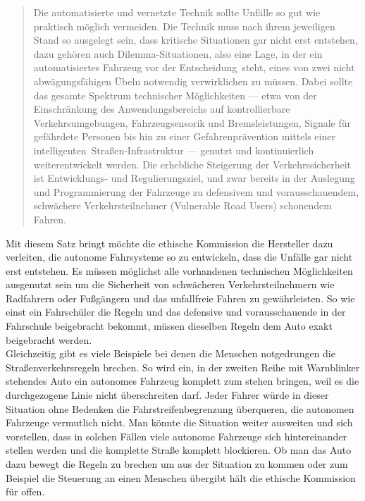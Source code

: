 \documentclass[twoside,a4paper,12pt]{article}
\begin{document}
\begin{quote}
\glqq
Die automatisierte und vernetzte Technik sollte Unfälle so gut wie praktisch möglich vermeiden. Die Technik muss nach 
ihrem jeweiligen Stand so ausgelegt sein, dass kritische
Situationen gar nicht erst entstehen, dazu gehören auch Dilemma-Situationen, also eine
Lage, in der ein automatisiertes Fahrzeug vor der \glqq Entscheidung\grqq\ steht, eines von zwei
nicht abwägungsfähigen Übeln notwendig verwirklichen zu müssen. Dabei sollte das gesamte Spektrum technischer 
Möglichkeiten --- etwa von der Einschränkung des Anwendungsbereichs auf kontrollierbare Verkehrsumgebungen, 
Fahrzeugsensorik und Bremsleistungen, Signale für gefährdete Personen bis hin zu einer Gefahrenprävention mittels
einer \glqq intelligenten\grqq\ Straßen-Infrastruktur --- genutzt und kontinuierlich weiterentwickelt
werden. Die erhebliche Steigerung der Verkehrssicherheit ist Entwicklungs- und Regulierungsziel, und zwar bereits in der 
Auslegung und Programmierung der Fahrzeuge zu defensivem und vorausschauendem, schwächere Verkehrsteilnehmer (\glqq Vulnerable Road
Users\grqq) schonendem Fahren.\grqq\mbox{~\cite[S. 10]{ek}}
\end{quote}
Mit diesem Satz bringt möchte die ethische Kommission die Hersteller dazu verleiten, die autonome Fahrsysteme so zu entwickeln, dass die Unfälle gar nicht erst entstehen.  Es müssen möglichst alle vorhandenen technischen Möglichkeiten ausgenutzt sein um die Sicherheit von schwächeren Verkehrsteilnehmern wie Radfahrern oder Fußgängern und das unfallfreie Fahren zu gewährleisten. So wie einst ein Fahrschüler die Regeln und das defensive und vorausschauende in der Fahrschule beigebracht bekommt, müssen dieselben Regeln dem Auto exakt beigebracht werden. \\ Gleichzeitig gibt es viele Beispiele bei denen die Menschen notgedrungen die Straßenverkehrsregeln brechen. So wird ein, in der zweiten Reihe mit Warnblinker stehendes Auto ein autonomes Fahrzeug komplett zum stehen bringen, weil es die durchgezogene Linie nicht überschreiten darf. \cite{zeit1} Jeder Fahrer würde in dieser Situation ohne Bedenken die Fahrstreifenbegrenzung überqueren, die autonomen Fahrzeuge vermutlich nicht. Man könnte die Situation weiter ausweiten und sich vorstellen, dass in solchen Fällen viele autonome Fahrzeuge sich hintereinander stellen werden und die komplette Straße komplett blockieren. Ob man das Auto dazu bewegt die Regeln zu brechen um aus der Situation zu kommen oder zum Beispiel die Steuerung an einen Menschen übergibt hält die ethische Kommission für offen. 
\end{document}
